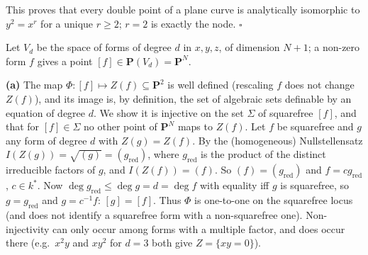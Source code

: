 \documentclass[11pt]{article}
\begin{document}
This proves that every double point of a plane curve is analytically isomorphic to $y^2=x^r$ for a unique $r\ge2$; $r=2$ is exactly the node. \hfill$\square$

\pf
Let $V_d$ be the space of forms of degree $d$ in $x,y,z$, of dimension $N+1$; a non-zero form $f$ gives a point $[f]\in\mathbf P(V_d)=\mathbf P^N$.

\textbf{(a)} The map $\Phi:[f]\mapsto Z(f)\subseteq\mathbf P^2$ is well defined (rescaling $f$ does not change $Z(f)$), and its image is, by definition, the set of algebraic sets definable by an equation of degree $d$. We show it is injective on the set $\Sigma$ of squarefree $[f]$, and that for $[f]\in\Sigma$ no other point of $\mathbf P^N$ maps to $Z(f)$. Let $f$ be squarefree and $g$ any form of degree $d$ with $Z(g)=Z(f)$. By the (homogeneous) Nullstellensatz $I(Z(g))=\sqrt{(g)}=(g_{\mathrm{red}})$, where $g_{\mathrm{red}}$ is the product of the distinct irreducible factors of $g$, and $I(Z(f))=(f)$. So $(f)=(g_{\mathrm{red}})$ and $f=cg_{\mathrm{red}}$, $c\in k^*$. Now $\deg g_{\mathrm{red}}\le\deg g=d=\deg f$ with equality iff $g$ is squarefree, so $g=g_{\mathrm{red}}$ and $g=c^{-1}f$: $[g]=[f]$. Thus $\Phi$ is one-to-one on the squarefree locus (and does not identify a squarefree form with a non-squarefree one). Non-injectivity can only occur among forms with a multiple factor, and does occur there (e.g.\ $x^2y$ and $xy^2$ for $d=3$ both give $Z=\{xy=0\}$).
\end{document}
